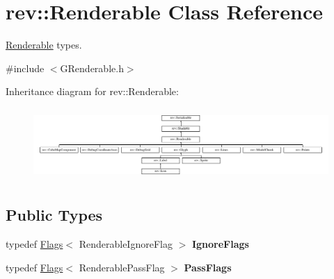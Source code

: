 \hypertarget{classrev_1_1_renderable}{}\section{rev\+::Renderable Class Reference}
\label{classrev_1_1_renderable}


\mbox{\hyperlink{classrev_1_1_renderable}{Renderable}} types.  




{\ttfamily \#include $<$G\+Renderable.\+h$>$}

Inheritance diagram for rev\+::Renderable\+:\begin{figure}[H]
\begin{center}
\leavevmode
\includegraphics[height=2.790698cm]{classrev_1_1_renderable}
\end{center}
\end{figure}
\subsection*{Public Types}
\begin{DoxyCompactItemize}
\item 
\mbox{\label{classrev_1_1_renderable_a4fac061dba00072f498254cd2dd3efa6}} 
typedef \mbox{\hyperlink{classrev_1_1_flags}{Flags}}$<$ Renderable\+Ignore\+Flag $>$ {\bfseries Ignore\+Flags}
\item 
\mbox{\label{classrev_1_1_renderable_a716bfbfdb0fb4f7e7914e109d0627e04}} 
typedef \mbox{\hyperlink{classrev_1_1_flags}{Flags}}$<$ Renderable\+Pass\+Flag $>$ {\bfseries Pass\+Flags}
\end{DoxyCompactItemize}
